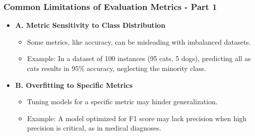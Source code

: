 \documentclass[aspectratio=169]{beamer}
\begin{document}
\begin{frame}[fragile]
    \frametitle{Common Limitations of Evaluation Metrics - Part 1}
    \begin{itemize}
        \item \textbf{A. Metric Sensitivity to Class Distribution}
        \begin{itemize}
            \item Some metrics, like accuracy, can be misleading with imbalanced datasets.
            \item Example: In a dataset of 100 instances (95 cats, 5 dogs), predicting all as cats results in 95\% accuracy, neglecting the minority class.
        \end{itemize}
        
        \item \textbf{B. Overfitting to Specific Metrics}
        \begin{itemize}
            \item Tuning models for a specific metric may hinder generalization.
            \item Example: A model optimized for F1 score may lack precision when high precision is critical, as in medical diagnoses.
        \end{itemize}
    \end{itemize}
\end{frame}
\end{document}

